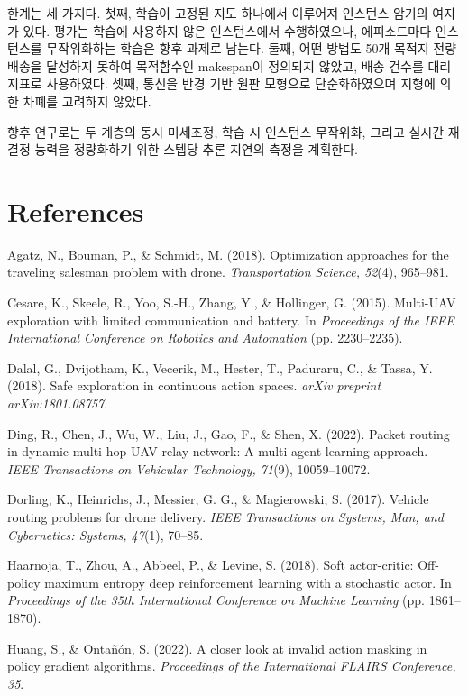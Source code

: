 \documentclass[12pt]{article}
\begin{document}
한계는 세 가지다. 첫째, 학습이 고정된 지도 하나에서 이루어져 인스턴스 암기의 여지가 있다.
평가는 학습에 사용하지 않은 인스턴스에서 수행하였으나, 에피소드마다 인스턴스를 무작위화하는
학습은 향후 과제로 남는다. 둘째, 어떤 방법도 50개 목적지 전량 배송을 달성하지 못하여 목적함수인
makespan이 정의되지 않았고, 배송 건수를 대리 지표로 사용하였다. 셋째, 통신을 반경 기반 원판
모형으로 단순화하였으며 지형에 의한 차폐를 고려하지 않았다.

향후 연구로는 두 계층의 동시 미세조정, 학습 시 인스턴스 무작위화, 그리고 실시간 재결정 능력을
정량화하기 위한 스텝당 추론 지연의 측정을 계획한다.

\section*{References}
\noindent Agatz, N., Bouman, P., \& Schmidt, M. (2018). Optimization approaches for the traveling
salesman problem with drone. \textit{Transportation Science, 52}(4), 965--981.

\noindent Cesare, K., Skeele, R., Yoo, S.-H., Zhang, Y., \& Hollinger, G. (2015). Multi-UAV
exploration with limited communication and battery. In \textit{Proceedings of the IEEE
International Conference on Robotics and Automation} (pp. 2230--2235).

\noindent Dalal, G., Dvijotham, K., Vecerik, M., Hester, T., Paduraru, C., \& Tassa, Y. (2018).
Safe exploration in continuous action spaces. \textit{arXiv preprint arXiv:1801.08757}.

\noindent Ding, R., Chen, J., Wu, W., Liu, J., Gao, F., \& Shen, X. (2022). Packet routing in
dynamic multi-hop UAV relay network: A multi-agent learning approach. \textit{IEEE Transactions
on Vehicular Technology, 71}(9), 10059--10072.

\noindent Dorling, K., Heinrichs, J., Messier, G. G., \& Magierowski, S. (2017). Vehicle routing
problems for drone delivery. \textit{IEEE Transactions on Systems, Man, and Cybernetics: Systems,
47}(1), 70--85.

\noindent Haarnoja, T., Zhou, A., Abbeel, P., \& Levine, S. (2018). Soft actor-critic: Off-policy
maximum entropy deep reinforcement learning with a stochastic actor. In \textit{Proceedings of the
35th International Conference on Machine Learning} (pp. 1861--1870).

\noindent Huang, S., \& Ontañón, S. (2022). A closer look at invalid action masking in policy
gradient algorithms. \textit{Proceedings of the International FLAIRS Conference, 35}.
\end{document}

